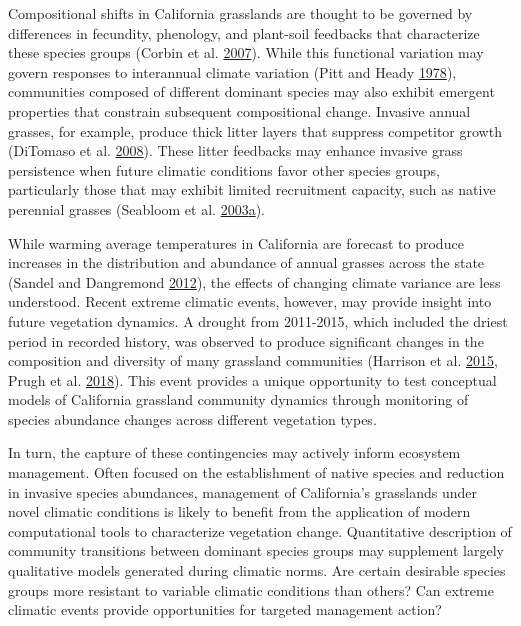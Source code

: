 \documentclass[twoside,12pt,final]{ucthesis-CA2012}
\begin{document}
\begin{ucmainmatter}
Compositional shifts in California grasslands are thought to be governed by differences in fecundity, phenology, and plant-soil feedbacks that characterize these species groups (Corbin et al. \protect\hyperlink{ref-Corbin2007}{2007}).
While this functional variation may govern responses to interannual climate variation (Pitt and Heady \protect\hyperlink{ref-Pitt1978}{1978}), communities composed of different dominant species may also exhibit emergent properties that constrain subsequent compositional change.
Invasive annual grasses, for example, produce thick litter layers that suppress competitor growth (DiTomaso et al. \protect\hyperlink{ref-DiTomaso2008}{2008}).
These litter feedbacks may enhance invasive grass persistence when future climatic conditions favor other species groups, particularly those that may exhibit limited recruitment capacity, such as native perennial grasses (Seabloom et al. \protect\hyperlink{ref-Seabloom2003}{2003}\protect\hyperlink{ref-Seabloom2003}{a}).

While warming average temperatures in California are forecast to produce increases in the distribution and abundance of annual grasses across the state (Sandel and Dangremond \protect\hyperlink{ref-Sandel2012}{2012}), the effects of changing climate variance are less understood.
Recent extreme climatic events, however, may provide insight into future vegetation dynamics.
A drought from 2011-2015, which included the driest period in recorded history, was observed to produce significant changes in the composition and diversity of many grassland communities (Harrison et al. \protect\hyperlink{ref-Harrison2015}{2015}, Prugh et al. \protect\hyperlink{ref-Prugh2018}{2018}).
This event provides a unique opportunity to test conceptual models of California grassland community dynamics through monitoring of species abundance changes across different vegetation types.

In turn, the capture of these contingencies may actively inform ecosystem management.
Often focused on the establishment of native species and reduction in invasive species abundances, management of California's grasslands under novel climatic conditions is likely to benefit from the application of modern computational tools to characterize vegetation change.
Quantitative description of community transitions between dominant species groups may supplement largely qualitative models generated during climatic norms. Are certain desirable species groups more resistant to variable climatic conditions than others? Can extreme climatic events provide opportunities for targeted management action?


\end{ucmainmatter}
\end{document}
